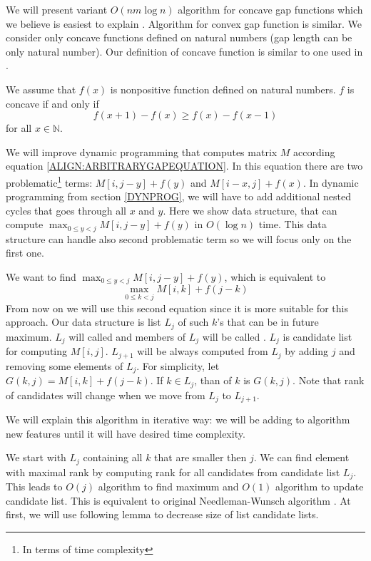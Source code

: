We will present variant $O(nm\log n)$ algorithm for concave gap functions which
we believe is easiest to explain . Algorithm for convex gap function is similar.
We consider only concave functions defined on natural numbers (gap length can be only
natural number). Our definition of concave function is similar to one used in
\cite{GusfieldBook}.

\begin{definition}
We assume that $f(x)$ is nonpositive function defined on natural numbers. $f$
is concave if and only if 
\[f(x+1)-f(x)\geq f(x)-f(x-1)\]
for all $x\in\mathbb{N}$.
\end{definition}

We will improve dynamic programming that computes matrix $M$ according equation
\ref{ALIGN:ARBITRARYGAPEQUATION}. In this equation there are two
problematic\footnote{In terms of time complexity} terms: $M[i,j-y]+f(y)$ and
$M[i-x,j]+f(x)$. In dynamic programming from section \ref{DYNPROG}, we will have
to add additional nested cycles that goes through all $x$ and $y$. Here we show
data structure, that can compute $\max_{0\leq y < j}M[i,j-y]+f(y)$ in $O(\log
n)$ time. This data structure can handle also second problematic term so we will
focus only on the first one.

We want to find $\max_{0\leq y < j}M[i,j-y]+f(y)$, which is equivalent to
\begin{equation}
\max_{0\leq k < j}M[i,k]+f(j-k)\label{CONVEX:MAXFUNCTION}
\end{equation}
From now on we will use this second equation since it is more suitable for this
approach.  Our data structure is list $L_j$ of such $k$'s that can be in future
maximum. $L_j$ will called  and members of $L_j$ will be
called . $L_j$ is candidate list for computing $M[i,j]$.
$L_{j+1}$ will be always computed from $L_j$ by adding $j$ and removing some
elements of $L_j$. For simplicity, let $G(k,j) = M[i,k]+f(j-k)$. If $k\in L_j$,
than  of $k$ is $G(k,j)$. Note that rank of candidates will
change when we move from $L_j$ to $L_{j+1}$.

We will explain this algorithm in iterative way: we will be adding to algorithm
new features until it will have desired time complexity. 

We start with $L_j$ containing all $k$ that are smaller then $j$.  We can find
element with maximal rank by computing rank for all candidates from candidate
list $L_j$. This leads to $O(j)$ algorithm to find maximum and $O(1)$ algorithm
to update candidate list. This is equivalent to original Needleman-Wunsch
algorithm \cite{Needleman1970}. At first, we will use following lemma to
decrease size of list candidate lists.

